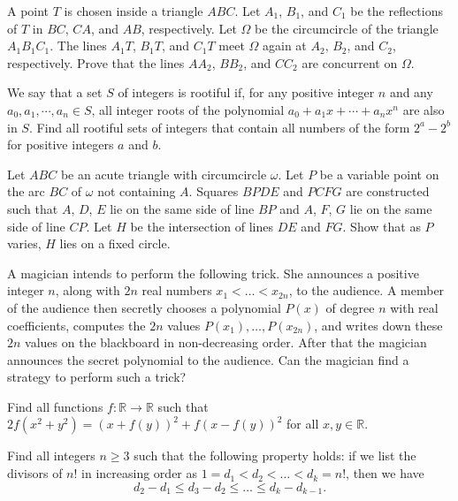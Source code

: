 \documentclass[11pt]{scrartcl}
\begin{document}
\begin{problem}[2918584823978789760]
A point $T$ is chosen inside a triangle $ABC$. Let $A_1$, $B_1$, and $C_1$ be the reflections of $T$ in $BC$, $CA$, and $AB$, respectively. Let $\Omega$ be the circumcircle of the triangle $A_1B_1C_1$. The lines $A_1T$, $B_1T$, and $C_1T$ meet $\Omega$ again at $A_2$, $B_2$, and $C_2$, respectively. Prove that the lines $AA_2$, $BB_2$, and $CC_2$ are concurrent on $\Omega$.
\end{problem}
\begin{problem}[4892352754475215646]
	We say that a set $S$ of integers is rootiful if, for any positive integer $n$ and any $a_0, a_1, \cdots, a_n \in S$, all integer roots of the polynomial $a_0+a_1x+\cdots+a_nx^n$ are also in $S$. Find all rootiful sets of integers that contain all numbers of the form $2^a - 2^b$ for positive integers $a$ and $b$.
\end{problem}
\begin{problem}[8700998965901287095]
Let \(ABC\) be an acute triangle with circumcircle \(\omega\). Let \(P\) be a variable point on the arc \(BC\) of \(\omega\) not containing \(A\). Squares \(BPDE\) and \(PCFG\) are constructed such that \(A\), \(D\), \(E\) lie on the same side of line \(BP\) and \(A\), \(F\), \(G\) lie on the same side of line \(CP\). Let \(H\) be the intersection of lines \(DE\) and \(FG\). Show that as \(P\) varies, \(H\) lies on a fixed circle.
\end{problem}
\begin{problem}[448881061747528]
A magician intends to perform the following trick. She announces a positive integer $n$, along with $2n$ real numbers $x_1 < \dots < x_{2n}$, to the audience. A member of the audience then secretly chooses a polynomial $P(x)$ of degree $n$ with real coefficients, computes the $2n$ values $P(x_1), \dots , P(x_{2n})$, and writes down these $2n$ values on the blackboard in non-decreasing order. After that the magician announces the secret polynomial to the audience. Can the magician find a strategy to perform such a trick?
\end{problem}
\begin{problem}[951015231425815]
	Find all functions $f:\mathbb{R}\rightarrow\mathbb{R}$ such that $2f(x^2+y^2)=(x+f(y))^2+f(x-f(y))^2$ for all $x,y\in\mathbb{R}$.
\end{problem}
\begin{problem}[4298196647118074747]
	Find all integers $n \geq 3$ such that the following property holds: if we list the divisors of $n!$ in increasing order as $1 = d_1 < d_2 < \dots < d_k = n!$, then we have
\[ d_2 - d_1 \leq d_3 - d_2 \leq \dots \leq d_k - d_{k-1}. \]
\end{problem}
\end{document}
